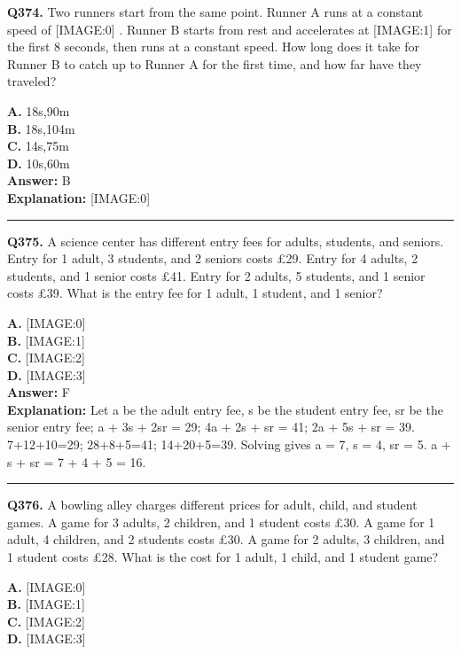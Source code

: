 \documentclass[12pt]{article}
\begin{document}
\noindent
\textbf{Q374.} Two runners start from the same point. Runner A runs at a constant speed of
[IMAGE:0]
. Runner B starts from rest and accelerates at
[IMAGE:1]
for the first 8
seconds, then runs at a constant speed. How long does it take for Runner B to catch up to Runner A for the first time, and how far have they traveled?



\textbf{A.} 18s,90m \\
\textbf{B.} 18s,104m \\
\textbf{C.} 14s,75m \\
\textbf{D.} 10s,60m \\

\textbf{Answer:} B \\
\textbf{Explanation:} [IMAGE:0]

\hrule
\vspace{1em}


\noindent
\textbf{Q375.} A science center has different entry fees for adults, students, and seniors.
Entry for 1 adult, 3 students, and 2 seniors costs £29.
Entry for 4 adults, 2 students, and 1 senior costs £41.
Entry for 2 adults, 5 students, and 1 senior costs £39.
What is the entry fee for 1 adult, 1 student, and 1 senior?



\textbf{A.} [IMAGE:0] \\
\textbf{B.} [IMAGE:1] \\
\textbf{C.} [IMAGE:2] \\
\textbf{D.} [IMAGE:3] \\

\textbf{Answer:} F \\
\textbf{Explanation:} Let a be the adult entry fee, s be the student entry fee, sr be the senior entry fee;
a + 3s + 2sr = 29; 4a + 2s + sr = 41; 2a + 5s + sr = 39.
7+12+10=29; 28+8+5=41; 14+20+5=39.
Solving gives a = 7, s = 4, sr = 5.
a + s + sr = 7 + 4 + 5 = 16.

\hrule
\vspace{1em}


\noindent
\textbf{Q376.} A bowling alley charges different prices for adult, child, and student games.
A game for 3 adults, 2 children, and 1 student costs £30.
A game for 1 adult, 4 children, and 2 students costs £30.
A game for 2 adults, 3 children, and 1 student costs £28.
What is the cost for 1 adult, 1 child, and 1 student game?



\textbf{A.} [IMAGE:0] \\
\textbf{B.} [IMAGE:1] \\
\textbf{C.} [IMAGE:2] \\
\textbf{D.} [IMAGE:3] \\
\end{document}
